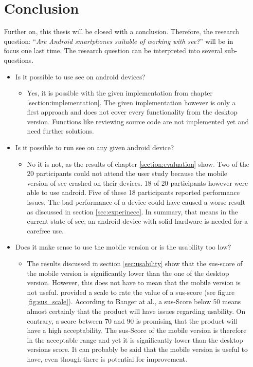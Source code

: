 \section{Conclusion}
\label{section:conclusion}
Further on, this thesis will be closed with a conclusion.
Therefore, the research question: \enquote{\textit{Are Android smartphones suitable of working with \gls{see}?}} will be in focus one last time.
The research question can be interpreted into several sub-questions. 
\begin{itemize}
    \item Is it possible to use \gls{see} on \gls{android} devices?
    \begin{itemize}
        \item Yes, it is possible with the given implementation from chapter \ref{section:implementation}.
        The given implementation however is only a first approach and does not cover every functionality from the desktop version.
        Functions like reviewing source code are not implemented yet and need further solutions. 
    \end{itemize}
    \item Is it possible to run \gls{see} on any given \gls{android} device?
    \begin{itemize}
        \item No it is not, as the results of chapter \ref{section:evaluation} show. 
        Two of the 20 participants could not attend the user study because the mobile version of \gls{see} crashed on their devices.
        18 of 20 participants however were able to use \gls{android}. 
        Five of these 18 participants reported performance issues.
        The bad performance of a device could have caused a worse result as discussed in section \ref{sec:experinece}.
        In summary, that means in the current state of \gls{see}, an \gls{android} device with solid hardware is needed for a carefree use.
    \end{itemize}
    \item Does it make sense to use the mobile version or is the \gls{usability} too low? 
    \begin{itemize}
        \item The results discussed in section \ref{sec:usability} show that the \gls{sus}-score of the mobile version is significantly lower than the one of the desktop version.
        However, this does not have to mean that the mobile version is not useful. 
        \cite{doi:10.1080/10447310802205776} provided a scale to rate the value of a \gls{sus}-score (see figure \ref{fig:sus_scale}).
        According to Banger at al., a \gls{sus}-Score below 50 means almost certainly that the product will have issues regarding \gls{usability}.
        On contrary, a score between 70 and 90 is promising that the product will have a high acceptability.
        The \gls{sus}-Score of the mobile version is therefore in the acceptable range and yet it is significantly lower than the desktop versions score.
        It can probably be said that the mobile version is useful to have, even though there is potential for improvement.
    \end{itemize}
\end{itemize}


